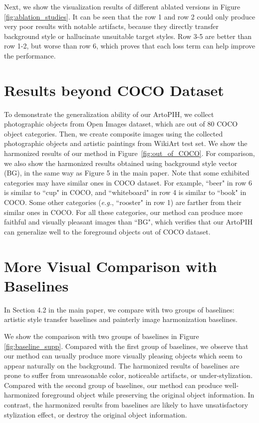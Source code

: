 \documentclass[letterpaper]{article} %
\begin{document}
Next, we show the visualization results of different ablated versions in Figure \ref{fig:ablation_studies}. It can be seen that the row 1 and row 2 could only produce very poor results with notable artifacts,  because they directly transfer background style or hallucinate unsuitable target styles. Row 3-5 are better than row 1-2, but worse than row 6, which proves that each loss term can help improve the performance. 





\section{Results beyond COCO Dataset} \label{sec:out_of_COCO}
To demonstrate the generalization ability of our ArtoPIH, we collect  photographic objects from Open Images \cite{Kuznetsova2020TheOI} dataset, which are out of $80$ COCO \cite{lin2014microsoft} object categories. Then, we create composite images using the collected photographic objects and artistic paintings from WikiArt \cite{nichol2016painter} test set. We show the harmonized results of our method in Figure~\ref{fig:out_of_COCO}. For comparison, we also show the harmonized results obtained using background style vector (BG), in the same way as Figure 5 in the main paper. Note that some exhibited categories may have similar ones in COCO dataset. For example, ``beer" in row 6 is similar to ``cup" in COCO, and ``whiteboard" in row 4 is similar to ``book" in COCO. Some other categories (\emph{e.g.}, ``rooster" in row 1) are farther from their similar ones in COCO. For all these categories, our method can produce more faithful and visually pleasant images than ``BG", which verifies that our ArtoPIH can generalize well to the foreground objects out of COCO dataset. 

\section{More Visual Comparison with Baselines} \label{sec:cmp_with_baseline}

In Section 4.2 in the main paper, we compare with two groups of baselines: artistic style transfer baselines and painterly image harmonization baselines.  

We show the comparison with two groups of baselines in Figure \ref{fig:baseline_supp}. Compared with the first group of baselines, we observe that our method can usually produce more visually pleasing objects which seem to appear naturally on the background. The harmonized results of baselines are prone to  suffer from unreasonable color, noticeable artifacts, or under-stylization. Compared with the second group of baselines, our method can produce well-harmonized foreground object while preserving the original object information. In contrast, the harmonized results from baselines are likely to have unsatisfactory stylization effect, or destroy the original object information. 
\end{document}
